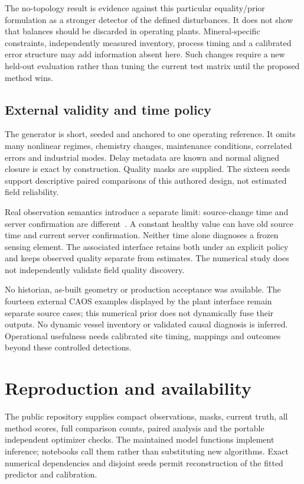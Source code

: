 \documentclass[11pt,a4paper]{article}
\begin{document}
The no-topology result is evidence against this particular equality/prior formulation as a stronger detector of the defined disturbances. It does not show that balances should be discarded in operating plants. Mineral-specific constraints, independently measured inventory, process timing and a calibrated error structure may add information absent here. Such changes require a new held-out evaluation rather than tuning the current test matrix until the proposed method wins.

\subsection{External validity and time policy}
The generator is short, seeded and anchored to one operating reference. It omits many nonlinear regimes, chemistry changes, maintenance conditions, correlated errors and industrial modes. Delay metadata are known and normal aligned closure is exact by construction. Quality masks are supplied. The sixteen seeds support descriptive paired comparisons of this authored design, not estimated field reliability.

Real observation semantics introduce a separate limit: source-change time and server confirmation are different~\cite{datavalue}. A constant healthy value can have old source time and current server confirmation. Neither time alone diagnoses a frozen sensing element. The associated interface retains both under an explicit policy and keeps observed quality separate from estimates. The numerical study does not independently validate field quality discovery.

No historian, as-built geometry or production acceptance was available. The fourteen external CAOS examples displayed by the plant interface remain separate source cases; this numerical prior does not dynamically fuse their outputs. No dynamic vessel inventory or validated causal diagnosis is inferred. Operational usefulness needs calibrated site timing, mappings and outcomes beyond these controlled detections.

\section{Reproduction and availability}
The public repository supplies compact observations, masks, current truth, all method scores, full comparison counts, paired analysis and the portable independent optimizer checks. The maintained model functions implement inference; notebooks call them rather than substituting new algorithms. Exact numerical dependencies and disjoint seeds permit reconstruction of the fitted predictor and calibration.
\end{document}
